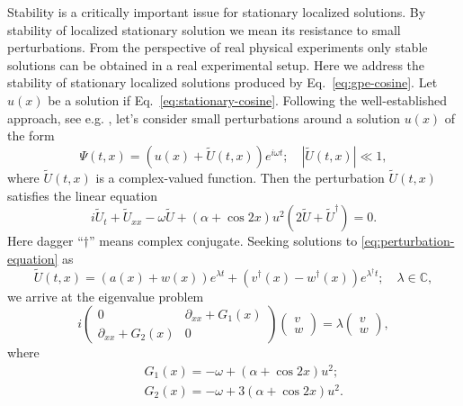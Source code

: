 Stability is a critically important issue for stationary localized solutions.
By stability of localized stationary solution we mean its resistance to small perturbations.
From the perspective of real physical experiments only stable solutions can be obtained in a real experimental setup.
Here we address the stability of stationary localized solutions produced by Eq.~\eqref{eq:gpe-cosine}.
Let $u(x)$ be a solution if Eq.~\eqref{eq:stationary-cosine}.
Following the well-established approach, see e.g. \cite{JiankeYang}, let's consider small perturbations around a solution $u(x)$ of the form
\begin{equation}
	\Psi(t, x) = \left( u(x) + \widetilde{U}(t, x) \right) e^{i \omega t}; \quad |\widetilde{U}(t, x)| \ll 1,
\label{eq:perturbation}
\end{equation}
where $\widetilde{U}(t, x)$ is a complex-valued function.
Then the perturbation $\widetilde{U}(t, x)$ satisfies the linear equation
\begin{equation}
	i \widetilde{U}_t + \widetilde{U}_{xx} - \omega \widetilde{U} + (\alpha + \cos 2x) u^2 (2 \widetilde{U} + \widetilde{U}^\dagger) = 0.
\label{eq:perturbation-equation}
\end{equation}
Here dagger ``$\dagger$'' means complex conjugate.
Seeking solutions to \eqref{eq:perturbation-equation} as
\begin{equation}
	\widetilde{U}(t, x) = (a(x) + w(x)) e^{\lambda t} + (v^{\dagger}(x) - w^{\dagger}(x)) e^{\lambda^{\dagger} t}; \quad \lambda \in \mathbb{C},
\end{equation}
we arrive at the eigenvalue problem
\begin{equation}
	i
	\begin{pmatrix}
		0 & \partial_{xx} + G_1(x) \\
		\partial_{xx} + G_2(x) & 0
	\end{pmatrix}
	\begin{pmatrix}
		v \\
		w
	\end{pmatrix}
	= \lambda 
	\begin{pmatrix}
		v \\
		w
	\end{pmatrix},
\label{eq:eigenvalue-problem}
\end{equation}
where
\begin{eqnarray*}
	&& G_1(x) = -\omega + (\alpha + \cos 2x) u^2; \\
	&& G_2(x) = -\omega + 3 (\alpha + \cos 2x) u^2.
\end{eqnarray*}

